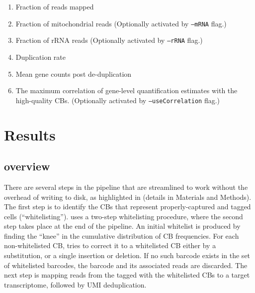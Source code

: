 \begin{enumerate}  
\item Fraction of reads mapped
\item Fraction of mitochondrial reads (Optionally activated by \texttt{{--}mRNA} flag.)
\item Fraction of rRNA reads (Optionally activated by \texttt{{--}rRNA} flag.)
\item Duplication rate
\item Mean gene counts post de-duplication
\item The maximum correlation of gene-level quantification estimates with the high-quality CBs. (Optionally activated by \texttt{{--}useCorrelation} flag.)
\end{enumerate}


\section{Results}

\subsection{\Alevin overview}
There are several steps in the \alevin pipeline that are streamlined to work without the overhead of writing to disk, as highlighted in  (details in Materials and Methods). The first step is to identify the CBs that represent properly-captured and tagged cells (``whitelisting''). \Alevin uses a two-step whitelisting procedure, where the second step takes place at the end of the pipeline. An initial whitelist is produced by finding the ``knee'' in the cumulative distribution of CB frequencies\citep{dropseq, tenx}. For each non-whitelisted CB, \alevin tries to correct it to a whitelisted CB either by a substitution, or a single insertion or deletion. If no such barcode exists in the set of whitelisted barcodes, the barcode and its associated reads are discarded. The next step is mapping reads from the tagged with the whitelisted CBs to a target transcriptome\citep{rapmap,selaln}, followed by UMI deduplication. 

